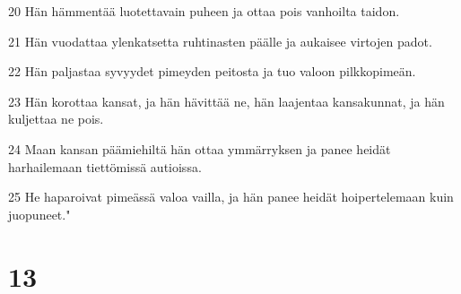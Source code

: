 \par 20 Hän hämmentää luotettavain puheen ja ottaa pois vanhoilta taidon.
\par 21 Hän vuodattaa ylenkatsetta ruhtinasten päälle ja aukaisee virtojen padot.
\par 22 Hän paljastaa syvyydet pimeyden peitosta ja tuo valoon pilkkopimeän.
\par 23 Hän korottaa kansat, ja hän hävittää ne, hän laajentaa kansakunnat, ja hän kuljettaa ne pois.
\par 24 Maan kansan päämiehiltä hän ottaa ymmärryksen ja panee heidät harhailemaan tiettömissä autioissa.
\par 25 He haparoivat pimeässä valoa vailla, ja hän panee heidät hoipertelemaan kuin juopuneet."

\chapter{13}


